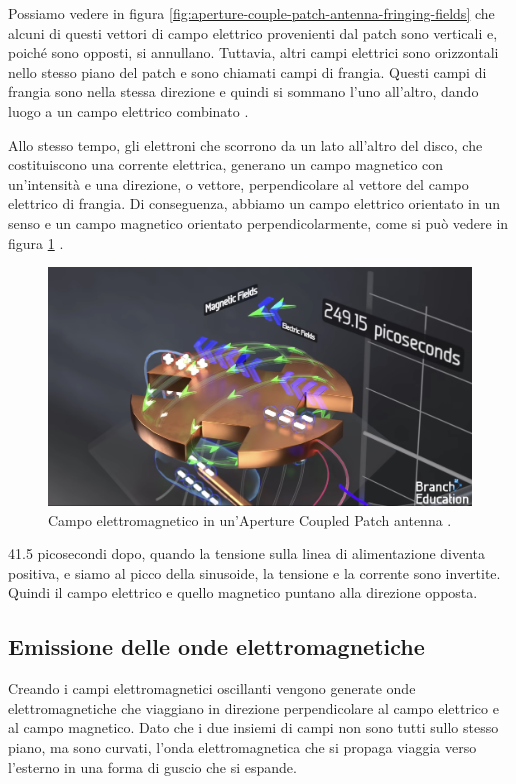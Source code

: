 Possiamo vedere in figura \ref{fig:aperture-couple-patch-antenna-fringing-fields} che alcuni di questi vettori di campo elettrico provenienti dal patch sono verticali e, poiché sono opposti, si annullano.
Tuttavia, altri campi elettrici sono orizzontali nello stesso piano del patch e sono chiamati campi di frangia.
Questi campi di frangia sono nella stessa direzione e quindi si sommano l'uno all'altro, dando luogo a un campo elettrico combinato \cite{branch_education_how_2022}.

Allo stesso tempo, gli elettroni che scorrono da un lato all'altro del disco, che costituiscono una corrente elettrica, generano un campo magnetico con un'intensità e una direzione, o vettore, perpendicolare al vettore del campo elettrico di frangia.
Di conseguenza, abbiamo un campo elettrico orientato in un senso e un campo magnetico orientato perpendicolarmente, come si può vedere in figura \ref{fig:aperture-couple-patch-antenna-em-field} \cite{branch_education_how_2022}.

\begin{figure}[htbp]
  \centering
  \includegraphics[width=0.8\linewidth]{./res/img/antenna_em_field.png}
  \caption{Campo elettromagnetico in un'Aperture Coupled Patch antenna \cite{branch_education_how_2022}.}
  \label{fig:aperture-couple-patch-antenna-em-field}
\end{figure}

41.5 picosecondi dopo, quando la tensione sulla linea di alimentazione diventa positiva, e siamo al picco della sinusoide, la tensione e la corrente sono invertite.
Quindi il campo elettrico e quello magnetico puntano alla direzione opposta.

\subsection{Emissione delle onde elettromagnetiche}
Creando i campi elettromagnetici oscillanti vengono generate onde elettromagnetiche che viaggiano in direzione perpendicolare al campo elettrico e al campo magnetico.
Dato che i due insiemi di campi non sono tutti sullo stesso piano, ma sono curvati, l'onda elettromagnetica che si propaga viaggia verso l'esterno in una forma di guscio che si espande.

